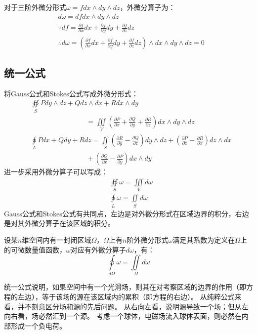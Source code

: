 对于三阶外微分形式$\omega =fdx\land dy\land dz$，外微分算子为：
\begin{align*}
&d\omega =dfdx\land dy\land dz \\
&\because df=\frac{\partial f}{\partial x}dx+\frac{\partial f}{\partial y}dy+\frac{\partial f}{\partial z}dz \\
&\therefore d\omega =\left( \frac{\partial f}{\partial x}dx+\frac{\partial f}{\partial y}dy+\frac{\partial f}{\partial z}dz \right) \land dx\land dy\land dz=0
\end{align*}

\subsection{统一公式}

将Gauss公式和Stokes公式写成外微分形式：
\begin{align*}
&\oiint\limits_S{Pdy\land dz+Qdz\land dx+Rdx\land dy} \\
& \qquad \qquad \qquad \qquad =\iiint\limits_V{\left( \frac{\partial P}{\partial x}+\frac{\partial Q}{\partial y}+\frac{\partial R}{\partial z} \right) dx\land dy\land dz} \\
&\oint\limits_L{Pdx+Qdy+Rdz}=\iint\limits_S{\left( \frac{\partial R}{\partial y}-\frac{\partial Q}{\partial z} \right) dy\land dz+\left( \frac{\partial P}{\partial z}-\frac{\partial R}{\partial x} \right) dz\land dx} \\
& \qquad \qquad \qquad \qquad +\left( \frac{\partial Q}{\partial x}-\frac{\partial P}{\partial y} \right) dx\land dy
\end{align*}
进一步采用外微分算子可以写成：
\begin{align*}
&\oiint\limits_S{\omega}=\iiint\limits_V{d\omega} \\
&\oint\limits_L{\omega}=\iint\limits_S{d\omega}
\end{align*}
Gauss公式和Stokes公式有共同点，左边是对外微分形式在区域边界的积分，右边是对其外微分算子在该区域的积分。

\begin{theorem}[微积分基本定理的统一公式]
设某$n$维空间内有一封闭区域$\varOmega $，$\varOmega $上有$n$阶外微分形式$\omega $满足其系数为定义在$\varOmega $上的可微数量值函数，$\omega $对应有外微分算子$d\omega $，有：
\[
\oint\limits_{d\varOmega}{\omega}=\iint\limits_{\varOmega}{d\omega}
\]
\end{theorem}

统一公式说明，如果空间中有一个光滑场，则其在对考察区域的边界的作用（即方程的左边），等于该场的源在该区域内的累积（即方程的右边）。
从纯粹公式来看，并不刻意区分场和源的先后问题。
从右向左看，说明源导致一个场；但从左向右看，场必然汇到一个源。
考虑一个球体，电磁场流入球体表面，则必然在内部形成一个负电荷。




